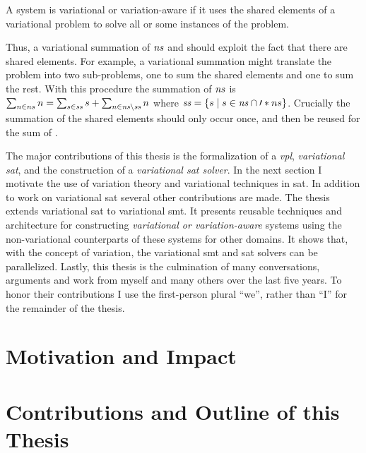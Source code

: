 \begin{definition}
  A system is variational or variation-aware if it uses the shared elements of a
  variational problem to solve all or some instances of the problem.
\end{definition}
%
Thus, a variational summation of $\mathit{ns}$ and  should exploit the
fact that there are shared elements. For example, a variational summation might
translate the problem into two sub-problems, one to sum the shared elements and
one to sum the rest. With this procedure the summation of $\mathit{ns}$ is $\sum_{n
  \in{} ns} n = \sum_{s \in{} \mathit{ss}} s + \sum_{n \in{} \mathit{ns} \setminus{}
  \mathit{ss}} n$ where $\kf{ss} = \setc{s}{s \in{} \kf{ns} \cap{} \prime*{ns}}$.
Crucially the summation of the shared elements should only occur once, and then
be reused for the sum of .

The major contributions of this thesis is the formalization of a
\emph{\acl{vpl}}, \emph{variational \acl{sat}}, and the construction of a
\emph{variational \ac{sat} solver}. In the next section I motivate the use of
variation theory and variational techniques in \acl{sat}. In addition to work on
variational \ac{sat} several other contributions are made. The thesis extends
variational \acl{sat} to variational \ac{smt}. It presents reusable techniques
and architecture for constructing \emph{variational or variation-aware} systems
using the non-variational counterparts of these systems for other domains. It
shows that, with the concept of variation, the variational \ac{smt} and \ac{sat}
solvers can be parallelized. Lastly, this thesis is the culmination of many
conversations, arguments and work from myself and many others over the last five
years. To honor their contributions I use the first-person plural ``we'', rather
than ``I'' for the remainder of the thesis.

\section{Motivation and Impact}


\section{Contributions and Outline of this Thesis}


